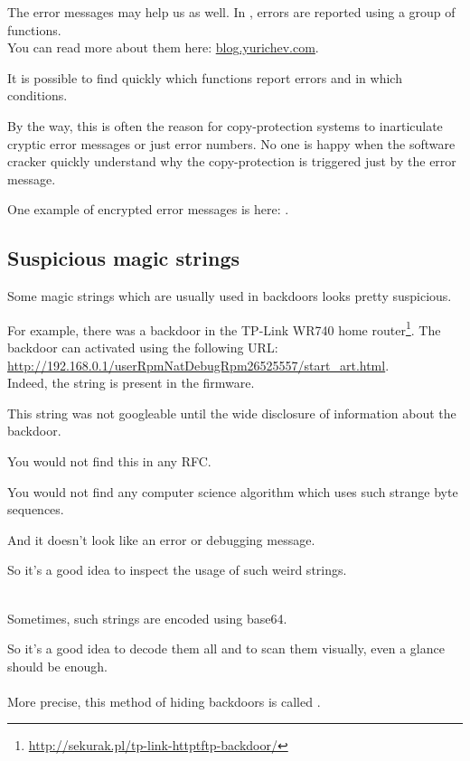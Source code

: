 The error messages may help us as well.
In \oracle, errors are reported using a group of functions.\\
You can read more about them here: \href{http://go.yurichev.com/17224}{blog.yurichev.com}.


It is possible to find quickly which functions report errors and in which conditions.

By the way, this is often the reason for copy-protection systems to inarticulate cryptic error messages 
or just error numbers. No one is happy when the software cracker quickly understand why the copy-protection
is triggered just by the error message.

One example of encrypted error messages is here: .

\subsection{Suspicious magic strings}

Some magic strings which are usually used in backdoors looks pretty suspicious.

For example, there was a backdoor in the TP-Link WR740 home router\footnote{\url{http://sekurak.pl/tp-link-httptftp-backdoor/}}.
The backdoor can activated using the following URL:\\
\url{http://192.168.0.1/userRpmNatDebugRpm26525557/start_art.html}.\\

Indeed, the  string is present in the firmware.

This string was not googleable until the wide disclosure of information about the backdoor.

You would not find this in any \ac{RFC}.

You would not find any computer science algorithm which uses such strange byte sequences.

And it doesn't look like an error or debugging message.

So it's a good idea to inspect the usage of such weird strings.\\
\\

Sometimes, such strings are encoded using
base64.

So it's a good idea to decode them all and to scan them visually, even a glance should be enough.\\
\\
More precise, this method of hiding backdoors is called .

